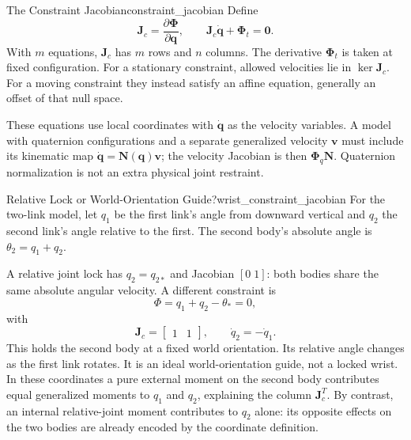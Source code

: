 \begin{definition}{The Constraint Jacobian}{constraint_jacobian}
Define
\begin{equation}
\bm J_c=\frac{\partial\bm\Phi}{\partial\bm q},
\qquad \bm J_c\dot{\bm q}+\bm\Phi_t=\bm0.
\label{eq:constraint_jacobian_definition}
\end{equation}
With $m$ equations, $\bm J_c$ has $m$ rows and $n$ columns. The derivative $\bm\Phi_t$ is taken at fixed configuration. For a stationary constraint, allowed velocities lie in $\ker\bm J_c$. For a moving constraint they instead satisfy an affine equation, generally an offset of that null space.

These equations use local coordinates with $\dot{\bm q}$ as the velocity variables. A model with quaternion configurations and a separate generalized velocity $\bm v$ must include its kinematic map $\dot{\bm q}=\bm N(\bm q)\bm v$; the velocity Jacobian is then $\bm\Phi_q\bm N$. Quaternion normalization is not an extra physical joint restraint.
\end{definition}

\begin{example}{Relative Lock or World-Orientation Guide?}{wrist_constraint_jacobian}
For the two-link model, let $q_1$ be the first link's angle from downward vertical and $q_2$ the second link's angle relative to the first. The second body's absolute angle is $\theta_2=q_1+q_2$.

A relative joint lock has $q_2=q_{2*}$ and Jacobian $[0\;1]$: both bodies share the same absolute angular velocity. A different constraint is
\begin{equation}
\Phi=q_1+q_2-\theta_* =0,
\label{eq:wrist_constraint_example}
\end{equation}
with
\begin{equation}
\bm J_c=\begin{bmatrix}1&1\end{bmatrix},
\qquad \dot q_2=-\dot q_1.
\label{eq:wrist_jacobian_example}
\end{equation}
This holds the second body at a fixed world orientation. Its relative angle changes as the first link rotates. It is an ideal world-orientation guide, not a locked wrist. In these coordinates a pure external moment on the second body contributes equal generalized moments to $q_1$ and $q_2$, explaining the column $\bm J_c^T$. By contrast, an internal relative-joint moment contributes to $q_2$ alone: its opposite effects on the two bodies are already encoded by the coordinate definition.
\end{example}


